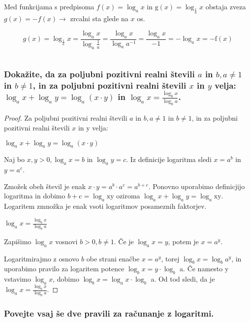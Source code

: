 \documentclass{article}
\begin{document}
Med funkcijama s predpisoma $f(x)=\log _{a} x$ in $\mathrm{g}(x)=\log _{\frac{1}{a}} x$ obstaja zveza $g(x)=-f(x) \rightarrow$ zrcalni sta glede na $x$ os.

$$
g(x)=\log _{\frac{1}{a}} x=\frac{\log _{a} x}{\log _{a} \frac{1}{a}}=\frac{\log _{a} x}{\log _{a} a^{-1}}=\frac{\log _{a} x}{-1}=-\log _{a} x=-\mathrm{f}(x)
$$

\section{\texorpdfstring{}{Računanje z logaritmi}}
\subsubsection*{Dokažite, da za poljubni pozitivni realni števili $a$ in $b, a \neq 1$ in $b \neq 1$, in za poljubni pozitivni realni števili $x$ in $y$ velja: $\log _{a} x+\log _{a} y=\log _{a}(x \cdot y)$ in $\log _{a} x=\frac{\log _{b} x}{\log _{b} a}$.}

\begin{proof}
    Za poljubni pozitivni realni števili $a$ in $b, a \neq 1$ in $b \neq 1$, in za poljubni pozitivni realni števili $x$ in y velja:

    $\log _{a} x+\log _{a} y=\log _{a}(x \cdot y)$

Naj bo $x, y>0, \log _{a} x=b$ in $\log _{a} y=c$. Iz definicije logaritma sledi $x=a^{b}$ in $y=a^{c}$.

Zmožek obeh števil je enak $x \cdot y=a^{b} \cdot a^{c}=a^{b+c}$. Ponovno uporabimo definicjijo logaritma in dobimo $b+\mathrm{c}=\log _{a} \mathrm{xy}$ oziroma $\log _{a} x+\log _{a} y=\log _{a} \mathrm{xy}$. Logaritem zmnožka je enak vsoti logaritmov posameznih faktorjev.

$\log _{a} x=\frac{\log _{b} x}{\log _{b} a}$

Zapišimo $\log _{a} x$ vosnovi $b>0, b \neq 1$. Če je $\log _{a} x=y$, potem je $x=a^{y}$.

Logaritmirajmo z osnovo $b$ obe strani enačbe $x=a^{y}$, torej $\log _{b} x=\log _{b} a^{y}$, in uporabimo pravilo za logaritem potence $\log _{b} x=y \cdot \log _{b}$ a. Če namesto y vstavimo $\log _{a} x$, dobimo $\log _{b} x=\log _{a} x \cdot \log _{b}$ a. Od tod sledi, da je $\log _{a} x=\frac{\log _{b} x}{\log _{b} a}$.
\end{proof}

\subsubsection*{Povejte vsaj še dve pravili za računanje z logaritmi.}
\end{document}
